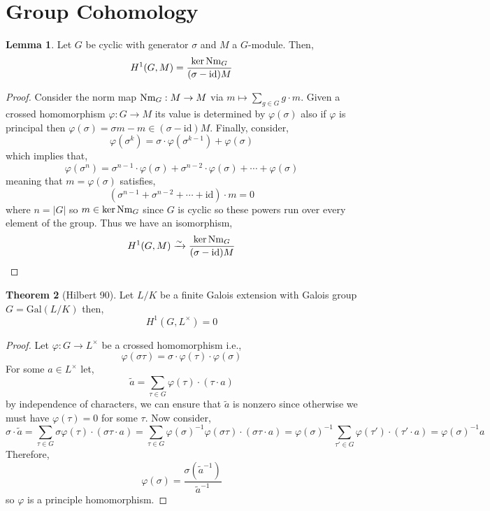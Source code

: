 \documentclass[12pt]{extarticle}
\newcommand{\id}{\mathrm{id}}
\theoremstyle{definition}
\newtheorem{theorem}{Theorem}[section]
\newtheorem{lemma}[theorem]{Lemma}
\begin{document}
\section{Group Cohomology}

\begin{lemma}
Let $G$ be cyclic with generator $\sigma$ and $M$ a $G$-module. Then,
\[ H^1(G, M) = \frac{\ker{\Nm_G}}{(\sigma - \id) M} \]
\end{lemma}

\begin{proof}
Consider the norm map $\mathrm{Nm}_G : M \to M$ via $m \mapsto \sum\limits_{g \in G} g \cdot m$. Given a crossed homomorphism $\varphi : G \to M$ its value is determined by $\varphi(\sigma)$
also if $\varphi$ is principal then $\varphi(\sigma) = \sigma m - m \in (\sigma - \id)M$. Finally, consider,
\[ \varphi(\sigma^k) = \sigma \cdot \varphi(\sigma^{k-1}) + \varphi(\sigma) \]
which implies that,
\[ \varphi(\sigma^n) = \sigma^{n-1} \cdot \varphi(\sigma) + \sigma^{n-2} \cdot \varphi(\sigma) + \cdots + \varphi(\sigma) \]
meaning that $m = \varphi(\sigma)$ satisfies,
\[ (\sigma^{n-1} + \sigma^{n-2} + \cdots + \id) \cdot m = 0 \]
where $n = |G|$ so $m \in \ker{\mathrm{Nm}_G}$ since $G$ is cyclic so these powers run over every element of the group. Thus we have an isomorphism,
\[ H^1(G, M) \xrightarrow{\sim} \frac{\ker{\Nm_G}}{(\sigma - \id)M} \]
\end{proof}

\begin{theorem}[Hilbert 90]
Let $L/K$ be a finite Galois extension with Galois group $G = \mathrm{Gal}(L/K)$ then,
\[ H^1(G, L^\times) = 0 \]
\end{theorem}

\begin{proof}
Let $\varphi : G \to L^\times$ be a crossed homomorphism i.e.,
\[ \varphi(\sigma \tau) = \sigma \cdot \varphi(\tau) \cdot \varphi(\sigma) \]
For some $a \in L^\times$ let,
\[ \tilde{a} = \sum_{\tau \in G} \varphi(\tau) \cdot (\tau \cdot a) \]
by independence of characters, we can ensure that $\tilde{a}$ is nonzero since otherwise we must have $\varphi(\tau) = 0$ for some $\tau$. 
Now consider,
\[ \sigma \cdot \tilde{a} = \sum_{\tau \in G} \sigma \varphi(\tau) \cdot (\sigma \tau \cdot a) = \sum_{\tau \in G} \varphi(\sigma)^{-1} \varphi(\sigma \tau) \cdot (\sigma \tau \cdot a) = \varphi(\sigma)^{-1} \sum_{\tau' \in G} \varphi(\tau') \cdot (\tau' \cdot a) = \varphi(\sigma)^{-1} a  \]
Therefore,
\[ \varphi(\sigma) = \frac{\sigma (\tilde{a}^{-1})}{\tilde{a}^{-1}} \]
so $\varphi$ is a principle homomorphism. 
\end{proof}
\end{document}
